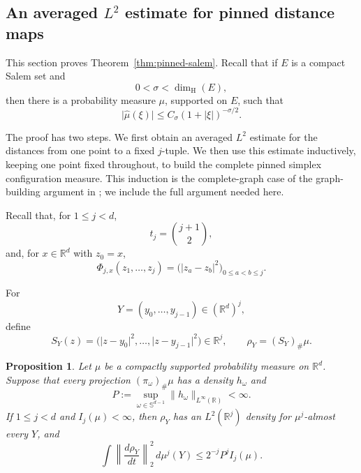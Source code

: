 \documentclass[11pt]{article}
\newtheorem{proposition}[theorem]{Proposition}
\theoremstyle{remark}
\newcommand{\R}{\mathbb R}
\newcommand{\Sph}{\mathbb S}
\newcommand{\wh}{\widehat}
\numberwithin{equation}{section}
\newcommand{\1}{\mathbf 1}
\begin{document}
\subsection{An averaged \texorpdfstring{\(L^2\)}{L2} estimate for pinned distance maps}

This section proves Theorem~\ref{thm:pinned-salem}.  Recall that if
\(E\) is a compact Salem set and
\[
0<\sigma<\dim_{\mathrm H}(E),
\]
then there is a probability measure \(\mu\), supported on \(E\), such
that
\begin{equation}
\lvert\wh\mu(\xi)\rvert
\leq
C_\sigma(1+\lvert\xi\rvert)^{-\sigma/2}.
\label{eq:salem-decay-pinned}
\end{equation}

The proof has two steps.  We first obtain an averaged \(L^2\) estimate
for the distances from one point to a fixed \(j\)-tuple.  We then use
this estimate inductively, keeping one point fixed throughout, to build
the complete pinned simplex configuration measure.  This induction is
the complete-graph case of the graph-building argument in
\cite{BFOPR}; we include the full argument needed here.

Recall that, for $1\le j<d$,
\[
t_j=\binom{j+1}{2},
\]
and, for $x\in\R^d$ with $z_0=x$,
\[
\Phi_{j,x}(z_1,\ldots,z_j)
=
\bigl(|z_a-z_b|^2\bigr)_{0\le a<b\le j}.
\]

For
\[
Y=(y_0,\ldots,y_{j-1})\in(\R^d)^j,
\]
define
\[
S_Y(z)
=
\bigl(
\lvert z-y_0\rvert^2,\ldots,
\lvert z-y_{j-1}\rvert^2
\bigr)
\in\R^j,
\qquad
\rho_Y=(S_Y)_\#\mu.
\]

\begin{proposition}
\label{prop:all-rank-star}
Let \(\mu\) be a compactly supported probability measure on
\(\R^d\).  Suppose that every projection
\((\pi_\omega)_\#\mu\) has a density \(h_\omega\) and
\begin{equation}
P
:=
\sup_{\omega\in\Sph^{d-1}}
\|h_\omega\|_{L^\infty(\R)}
<\infty.
\label{eq:uniform-projection-pinned}
\end{equation}
If \(1\leq j<d\) and \(I_j(\mu)<\infty\), then
\(\rho_Y\) has an \(L^2(\R^j)\) density for
\(\mu^j\)-almost every \(Y\), and
\begin{equation}
\int
\left\|
\frac{d\rho_Y}{dt}
\right\|_2^2
\,d\mu^j(Y)
\leq
2^{-j}P^j I_j(\mu).
\label{eq:all-rank-star-bound}
\end{equation}

\end{proposition}
\end{document}
